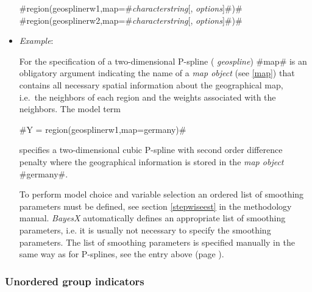 \begin{itemize}
#region(geosplinerw1,map=#{\em characterstring}[, {\em options}]#)# \\
#region(geosplinerw2,map=#{\em characterstring}[, {\em options}]#)#
\item[] {\em Example}:

For the specification of a two-dimensional P-spline ({\em
geospline}) #map# is an obligatory argument indicating the name of
a {\em map object} (see \autoref{map}) that contains all necessary
spatial information about the geographical map, i.e.~the neighbors
of each region and the weights associated with the neighbors. The
model term

#Y = region(geosplinerw1,map=germany)#

specifies a two-dimensional cubic P-spline with second order difference
penalty where the geographical information is stored in the
{\em map object} #germany#.

To perform model choice and variable selection an ordered list of smoothing parameters must be defined, see section
\autoref{stepwiseest} in the methodology manual. {\em BayesX} automatically defines an appropriate list of smoothing
parameters, i.e. it is usually not necessary to  specify the smoothing parameters.
The list of smoothing parameters is specified manually in the same way as for P-splines,
see the entry above (page \pageref{psplines_stepwise}).
\end{itemize}

\subsubsection*{Unordered group indicators}

